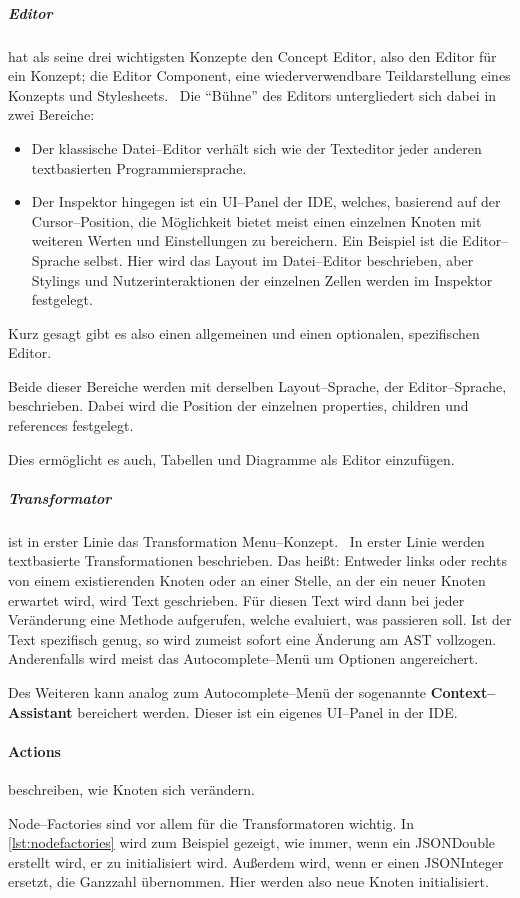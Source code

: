 \subparagraph{Editor} hat als seine drei wichtigsten Konzepte den {\ttfamily Concept Editor}, also den Editor für ein Konzept; die {\ttfamily Editor Component}, eine wiederverwendbare Teildarstellung eines Konzepts und Stylesheets.~\autocite{jetbrains-sro-no-dateH}
Die \enquote{Bühne} des Editors untergliedert sich dabei in zwei Bereiche:
\begin{itemize}
    \item Der klassische Datei--Editor verhält sich wie der Texteditor jeder anderen textbasierten Programmiersprache.
    \item Der Inspektor hingegen ist ein \ac{UI}--Panel der \ac{IDE}, welches, basierend auf der Cursor--Position, die Möglichkeit bietet meist einen einzelnen Knoten mit weiteren Werten und Einstellungen zu bereichern.
    Ein Beispiel ist die Editor--Sprache selbst.
    Hier wird das Layout im Datei--Editor beschrieben, aber Stylings und Nutzerinteraktionen der einzelnen Zellen werden im Inspektor festgelegt.
\end{itemize}
Kurz gesagt gibt es also einen allgemeinen und einen optionalen, spezifischen Editor.

Beide dieser Bereiche werden mit derselben Layout--Sprache, der Editor--Sprache, beschrieben.
Dabei wird die Position der einzelnen {\ttfamily properties}, {\ttfamily children} und {\ttfamily references} festgelegt.

Dies ermöglicht es auch, Tabellen und Diagramme als Editor einzufügen.

\subparagraph{Transformator} ist in erster Linie das {\ttfamily Transformation Menu}--Konzept.~\autocite{jetbrains-sro-no-dateI}
In erster Linie werden textbasierte Transformationen beschrieben.
Das heißt: Entweder links oder rechts von einem existierenden Knoten oder an einer Stelle, an der ein neuer Knoten erwartet wird, wird Text geschrieben.
Für diesen Text wird dann bei jeder Veränderung eine Methode aufgerufen, welche evaluiert, was passieren soll.
Ist der Text spezifisch genug, so wird zumeist sofort eine Änderung am \ac{AST} vollzogen.
Anderenfalls wird meist das Autocomplete--Menü um Optionen angereichert.

Des Weiteren kann analog zum Autocomplete--Menü der sogenannte \textbf{Context--Assistant} bereichert werden.
Dieser ist ein eigenes \acs{UI}--Panel in der \ac{IDE}.

\paragraph{Actions} beschreiben, wie Knoten sich verändern.~\autocite{jetbrains-sro-no-dateJ}

{\ttfamily Node--Factories} sind vor allem für die Transformatoren wichtig.
In \autoref{lst:nodefactories} wird zum Beispiel gezeigt, wie immer, wenn ein {\ttfamily JSONDouble} erstellt wird, er zu {} initialisiert wird.
Außerdem wird, wenn er einen {\ttfamily JSONInteger} ersetzt, die Ganzzahl übernommen.
Hier werden also neue Knoten initialisiert.

